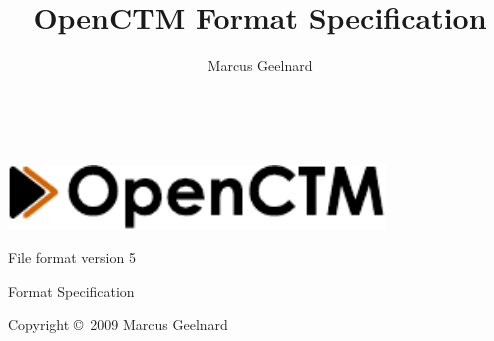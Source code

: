 %
%



\author{Marcus Geelnard}
\title{OpenCTM Format Specification}





\begin{titlepage}
\begin{center}
~
\vspace{5cm}

\includegraphics[width=10.0cm]{logo.pdf}
\vspace{0.4cm}

{\large File format version 5}

\vspace{1.0cm}

{\Large Format Specification}
\vspace{1.5cm}

Copyright \copyright \ 2009 Marcus Geelnard
\end{center}
\end{titlepage}




